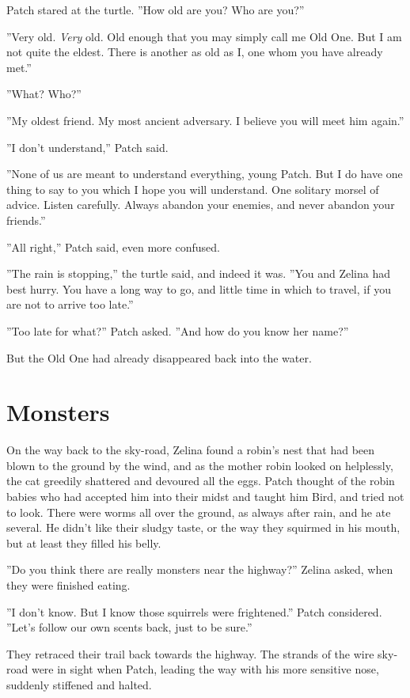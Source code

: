 \documentclass[12pt]{book}
\begin{document}
Patch stared at the turtle. ''How old are you? Who are you?''

''Very old. \textit{Very} old. Old enough that you may simply call me
Old One. But I am not quite the eldest. There is another as old as I,
one whom you have already met.''

''What? Who?''

''My oldest friend. My most ancient adversary. I believe you will meet
him again.''

''I don't understand,'' Patch said.

''None of us are meant to understand everything, young Patch. But I do
have one thing to say to you which I hope you will understand. One
solitary morsel of advice. Listen carefully. Always abandon your
enemies, and never abandon your friends.''

''All right,'' Patch said, even more confused.

''The rain is stopping,'' the turtle said, and indeed it was. ''You
and Zelina had best hurry. You have a long way to go, and little time
in which to travel, if you are not to arrive too late.''

''Too late for what?'' Patch asked. ''And how do you know her name?''

But the Old One had already disappeared back into the water.


\section{Monsters}

On the way back to the sky-road, Zelina found a robin's nest that had
been blown to the ground by the wind, and as the mother robin looked
on helplessly, the cat greedily shattered and devoured all the
eggs. Patch thought of the robin babies who had accepted him into
their midst and taught him Bird, and tried not to look. There were
worms all over the ground, as always after rain, and he ate
several. He didn't like their sludgy taste, or the way they squirmed
in his mouth, but at least they filled his belly.

''Do you think there are really monsters near the highway?'' Zelina
asked, when they were finished eating.

''I don't know. But I know those squirrels were frightened.'' Patch
considered. ''Let's follow our own scents back, just to be sure.''

They retraced their trail back towards the highway. The strands of the
wire sky-road were in sight when Patch, leading the way with his more
sensitive nose, suddenly stiffened and halted.
\end{document}
